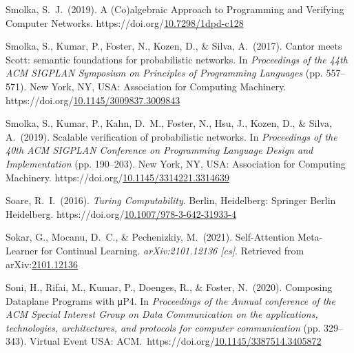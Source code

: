\documentclass[12pt,twoside]{article}
\begin{document}
{\begin{thebibliography}{1079}
\mdbibitemlabel{}Smolka, S.~J.~(2019). A (Co)algebraic Approach to Programming and Verifying Computer Networks. https://doi.org/\href{https://dx.doi.org/10.7298/1dpd-c128}{10.7298/1dpd-c128}%

\mdbibitemlabel{}Smolka, S., Kumar, P., Foster, N., Kozen, D., \& Silva, A.~(2017). Cantor meets Scott: semantic foundations for probabilistic networks. In \emph{Proceedings of the 44th ACM SIGPLAN Symposium on Principles of Programming Languages} (pp. 557–571). New York, NY, USA: Association for Computing Machinery. https://doi.org/\href{https://dx.doi.org/10.1145/3009837.3009843}{10.1145/3009837.3009843}%

\mdbibitemlabel{}Smolka, S., Kumar, P., Kahn, D.~M., Foster, N., Hsu, J., Kozen, D., \& Silva, A.~(2019). Scalable verification of probabilistic networks. In \emph{Proceedings of the 40th ACM SIGPLAN Conference on Programming Language Design and Implementation} (pp. 190–203). New York, NY, USA: Association for Computing Machinery. https://doi.org/\href{https://dx.doi.org/10.1145/3314221.3314639}{10.1145/3314221.3314639}%

\mdbibitemlabel{}Soare, R.~I.~(2016). \emph{Turing Computability}. Berlin, Heidelberg: Springer Berlin Heidelberg. https://doi.org/\href{https://dx.doi.org/10.1007/978-3-642-31933-4}{10.1007/978-3-642-31933-4}%

\mdbibitemlabel{}Sokar, G., Mocanu, D.~C., \& Pechenizkiy, M.~(2021). Self-Attention Meta-Learner for Continual Learning. \emph{arXiv:2101.12136 {}[cs]}. Retrieved from arXiv:\href{http://arxiv.org/abs/2101.12136}{2101.12136}%

\mdbibitemlabel{}Soni, H., Rifai, M., Kumar, P., Doenges, R., \& Foster, N.~(2020). Composing Dataplane Programs with μP4. In \emph{Proceedings of the Annual conference of the ACM Special Interest Group on Data Communication on the applications, technologies, architectures, and protocols for computer communication} (pp. 329–343). Virtual Event USA: ACM.~https://doi.org/\href{https://dx.doi.org/10.1145/3387514.3405872}{10.1145/3387514.3405872}%


\end{thebibliography}}
\end{document}
